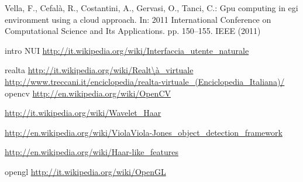 \begin{thebibliography}{10}

Vella, F., Cefal\`a, R., Costantini, A., Gervasi, O., Tanci, C.: Gpu computing
  in egi environment using a cloud approach. In: 2011 International Conference
  on Computational Science and Its Applications. pp. 150--155. IEEE (2011)
  

intro
 NUI \url{http://it.wikipedia.org/wiki/Interfaccia_utente_naturale}

realta
\url{http://it.wikipedia.org/wiki/Realt\à_virtuale}\\
\url{http://www.treccani.it/enciclopedia/realta-virtuale_(Enciclopedia_Italiana)/}
%
opencv
\url{http://en.wikipedia.org/wiki/OpenCV}
%

\url{http://it.wikipedia.org/wiki/Wavelet_Haar}

 \url{http://en.wikipedia.org/wiki/ViolaViola-Jones_object_detection_framework}

 \url{http://en.wikipedia.org/wiki/Haar-like_features}





%


opengl
 \url{http://it.wikipedia.org/wiki/OpenGL}


\end{thebibliography}
